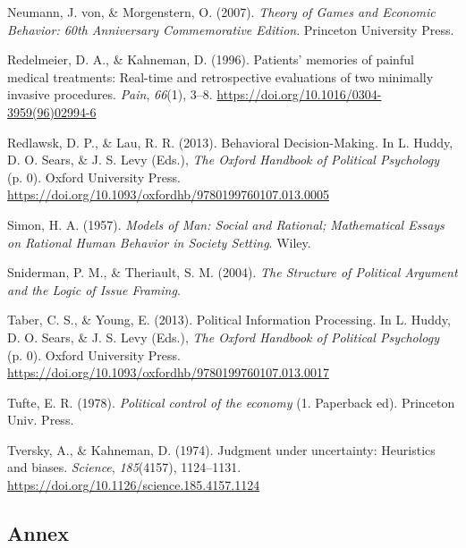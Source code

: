 \documentclass[
]{article}
\newlength{\cslhangindent}
\newlength{\cslentryspacingunit} %
\newenvironment{CSLReferences}[2] %
 {%
  \setlength{\parindent}{0pt}
  \ifodd #1
  \let\oldpar\par
  \def\par{\hangindent=\cslhangindent\oldpar}
  \fi
  \setlength{\parskip}{#2\cslentryspacingunit}
 }%
 {}
\begin{document}
\begin{CSLReferences}{1}{0}
\leavevmode{}%
Neumann, J. von, \& Morgenstern, O. (2007). \emph{Theory of {Games} and
{Economic Behavior}: 60th {Anniversary Commemorative Edition}}.
{Princeton University Press}.

\leavevmode{}%
Redelmeier, D. A., \& Kahneman, D. (1996). Patients' memories of painful
medical treatments: Real-time and retrospective evaluations of two
minimally invasive procedures. \emph{Pain}, \emph{66}(1), 3--8.
\url{https://doi.org/10.1016/0304-3959(96)02994-6}

\leavevmode{}%
Redlawsk, D. P., \& Lau, R. R. (2013). Behavioral {Decision-Making}. In
L. Huddy, D. O. Sears, \& J. S. Levy (Eds.), \emph{The {Oxford Handbook}
of {Political Psychology}} (p. 0). {Oxford University Press}.
\url{https://doi.org/10.1093/oxfordhb/9780199760107.013.0005}

\leavevmode{}%
Simon, H. A. (1957). \emph{Models of {Man}: {Social} and {Rational};
{Mathematical Essays} on {Rational Human Behavior} in {Society
Setting}}. {Wiley}.

\leavevmode{}%
Sniderman, P. M., \& Theriault, S. M. (2004). \emph{The {Structure} of
{Political Argument} and the {Logic} of {Issue Framing}}.

\leavevmode{}%
Taber, C. S., \& Young, E. (2013). Political {Information Processing}.
In L. Huddy, D. O. Sears, \& J. S. Levy (Eds.), \emph{The {Oxford
Handbook} of {Political Psychology}} (p. 0). {Oxford University Press}.
\url{https://doi.org/10.1093/oxfordhb/9780199760107.013.0017}

\leavevmode{}%
Tufte, E. R. (1978). \emph{Political control of the economy} (1.
Paperback ed). {Princeton Univ. Press}.

\leavevmode{}%
Tversky, A., \& Kahneman, D. (1974). Judgment under uncertainty:
{Heuristics} and biases. \emph{Science}, \emph{185}(4157), 1124--1131.
\url{https://doi.org/10.1126/science.185.4157.1124}

\end{CSLReferences}

\newpage

\hypertarget{annex}{%
\subsection{Annex}\label{annex}}
\end{document}
